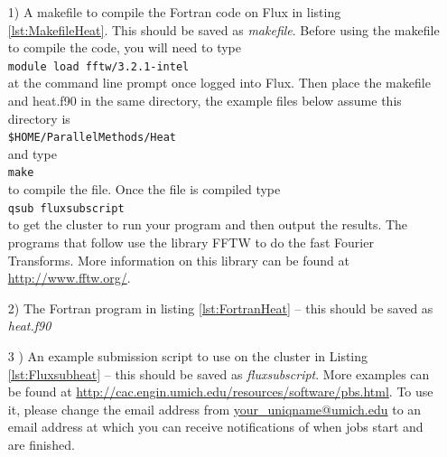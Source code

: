 \begin{enumerate}
\item[1)] A makefile to compile the Fortran code on Flux in listing \ref{lst:MakefileHeat}. This should be saved as {\it makefile}. Before using the makefile to compile the code, you will need to type\\
\texttt{module load fftw/3.2.1-intel}\\
at the command line prompt once logged into Flux. Then place the makefile and heat.f90 in the same directory, the example files below assume this directory is\\
\texttt{\${HOME}/ParallelMethods/Heat}\\
 and type\\
\texttt{make}\\
to compile the file. Once the file is compiled type\\
\texttt{qsub fluxsubscript}\\
to get the cluster to run your program and then output the results. The programs that follow use the library FFTW to do the fast Fourier Transforms. More information on this library can be found at \url{http://www.fftw.org/}.



\item[2)] The Fortran program in listing \ref{lst:FortranHeat} -- this should be saved as {\it heat.f90}


\item[3]) An example submission script to use on the cluster in Listing \ref{lst:Fluxsubheat} -- this should be saved as {\it fluxsubscript}. More examples can be found at \url{http://cac.engin.umich.edu/resources/software/pbs.html}. To use it, please change the email address from \url{your_uniqname@umich.edu} to an email address at which you can receive notifications of when jobs start and are finished. 




\end{enumerate}
